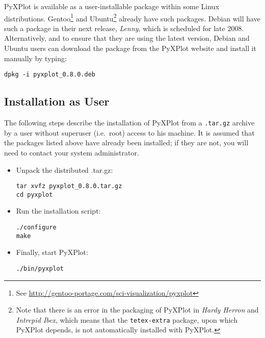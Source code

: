 PyXPlot is available as a user-installable package within some Linux
distributions. Gentoo\footnote{See \url{http://gentoo-portage.com/sci-visualization/pyxplot}}
and Ubuntu\footnote{Note
that there is an error in the packaging of PyXPlot in {\it Hardy Herron} and
{\it Intrepid Ibex}, which means that the {\tt tetex-extra} package, upon which
PyXPlot depends, is not automatically installed with PyXPlot.} already have
such packages. Debian will have such a package in their next release, {\it
Lenny}, which is scheduled for late 2008. Alternatively, and to ensure that
they are using the latest version, Debian and Ubuntu users can download the
package from the PyXPlot website and install it manually by typing:

\begin{verbatim}
dpkg -i pyxplot_0.8.0.deb
\end{verbatim}

\subsection{Installation as User}

The following steps describe the installation of PyXPlot from a {\tt .tar.gz}
archive by a user without superuser (i.e.\ root) access to his machine. It is
assumed that the packages listed above have already been installed; if they are
not, you will need to contact your system
administrator.

\begin{itemize}
\item Unpack the distributed .tar.gz:

\begin{verbatim}
tar xvfz pyxplot_0.8.0.tar.gz
cd pyxplot
\end{verbatim}

\item Run the installation script:

\begin{verbatim}
./configure
make
\end{verbatim}

\item Finally, start PyXPlot:

\begin{verbatim}
./bin/pyxplot
\end{verbatim}

\end{itemize}

